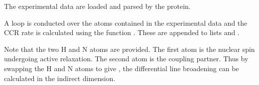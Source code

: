 \documentclass[a4paper,10pt,english,openany,oneside]{sphinxmanual}
\begin{document}
\sphinxAtStartPar
The experimental data are loaded and parsed by the protein.

\begin{sphinxVerbatim}[commandchars=\\\{\}]
  
  
\end{sphinxVerbatim}

\sphinxAtStartPar
A loop is conducted over the atoms contained in the experimental data and the CCR rate is calculated using the function {\hyperref[\detokenize{reference/generated/paramagpy.metal.Metal.atom_ccr:paramagpy.metal.Metal.atom_ccr}]{}}. These are appended to lists  and .

\sphinxAtStartPar
Note that the two H and N atoms are provided. The first atom is the nuclear spin undergoing active relaxation. The second atom is the coupling partner. Thus by swapping the H and N atoms to give , the differential line broadening can be calculated in the indirect dimension.
\end{document}
